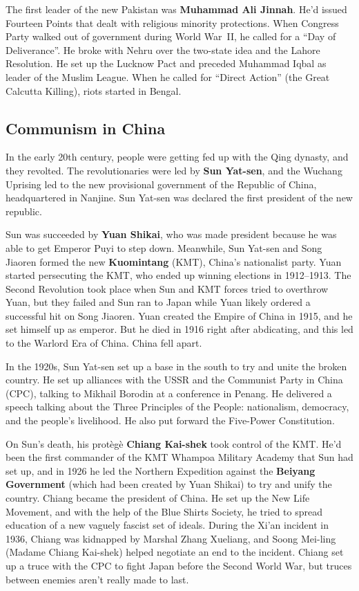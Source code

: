 The first leader of the new Pakistan was \textbf{Muhammad Ali Jinnah}.
He'd issued Fourteen Points that dealt with religious minority protections.
When Congress Party walked out of government during World War~II, he called for a ``Day of Deliverance''.
He broke with Nehru over the two-state idea and the Lahore Resolution.
He set up the Lucknow Pact and preceded Muhammad Iqbal as leader of the Muslim League.
When he called for ``Direct Action'' (the Great Calcutta Killing), riots started in Bengal.

\subsection*{Communism in China}

In the early 20th century, people were getting fed up with the Qing dynasty, and they revolted.
The revolutionaries were led by \textbf{Sun Yat-sen},
and the Wuchang Uprising led to the new provisional government of the Republic of China, headquartered in Nanjine.
Sun Yat-sen was declared the first president of the new republic.

Sun was succeeded by \textbf{Yuan Shikai},
who was made president because he was able to get Emperor Puyi to step down.
Meanwhile, Sun Yat-sen and Song Jiaoren formed the new \textbf{Kuomintang} (KMT), China's nationalist party.
Yuan started persecuting the KMT, who ended up winning elections in 1912--1913.
The Second Revolution took place when Sun and KMT forces tried to overthrow Yuan,
but they failed and Sun ran to Japan while Yuan likely ordered a successful hit on Song Jiaoren.
Yuan created the Empire of China in 1915, and he set himself up as emperor.
But he died in 1916 right after abdicating, and this led to the Warlord Era of China.
China fell apart.

In the 1920s, Sun Yat-sen set up a base in the south to try and unite the broken country.
He set up alliances with the USSR and the Communist Party in China (CPC),
talking to Mikhail Borodin at a conference in Penang.
He delivered a speech talking about the Three Principles of the People:
nationalism, democracy, and the people's livelihood.
He also put forward the Five-Power Constitution.

On Sun's death, his prot\`eg\`e \textbf{Chiang Kai-shek} took control of the KMT\@.
He'd been the first commander of the KMT Whampoa Military Academy that Sun had set up,
and in 1926 he led the Northern Expedition against the \textbf{Beiyang Government}
(which had been created by Yuan Shikai)
to try and unify the country.
Chiang became the president of China.
He set up the New Life Movement, and with the help of the Blue Shirts Society,
he tried to spread education of a new vaguely fascist set of ideals.
During the Xi'an incident in 1936, Chiang was kidnapped by Marshal Zhang Xueliang,
and Soong Mei-ling (Madame Chiang Kai-shek) helped negotiate an end to the incident.
Chiang set up a truce with the CPC to fight Japan before the Second World War,
but truces between enemies aren't really made to last.

